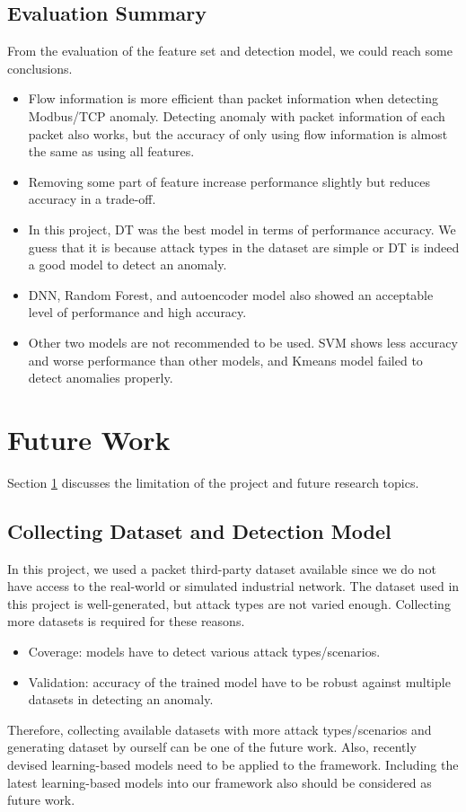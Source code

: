 \documentclass[fontsize=10pt]{article}
\begin{document}
\subsection{Evaluation Summary}
From the evaluation of the feature set and detection model, we could reach some conclusions.
\begin{itemize}
    \item Flow information is more efficient than packet information when detecting Modbus/TCP anomaly. Detecting anomaly with packet information of each packet also works, but the accuracy of only using flow information is almost the same as using all features. \item Removing some part of feature increase performance slightly but reduces accuracy in a trade-off. 
    \item In this project, DT was the best model in terms of performance accuracy. We guess that it is because attack types in the dataset are simple or DT is indeed a good model to detect an anomaly. 
    \item DNN, Random Forest, and autoencoder model also showed an acceptable level of performance and high accuracy. 
    \item Other two models are not recommended to be used. SVM shows less accuracy and worse performance than other models, and Kmeans model failed to detect anomalies properly.
\end{itemize}

\section{Future Work}
\label{future}
Section \ref{future} discusses the limitation of the project and future research topics.

\subsection{Collecting Dataset and Detection Model}
In this project, we used a packet third-party dataset available since we do not have access to the real-world or simulated industrial network. The dataset used in this project is well-generated, but attack types are not varied enough. Collecting more datasets is required for these reasons.
\begin{itemize}
    \item[] Coverage: models have to detect various attack types/scenarios.
    \item[] Validation: accuracy of the trained model have to be robust against multiple datasets in detecting an anomaly.
\end{itemize}
Therefore, collecting available datasets with more attack types/scenarios and generating dataset by ourself can be one of the future work. Also, recently devised learning-based models need to be applied to the framework. Including the latest learning-based models into our framework also should be considered as future work.  
\end{document}
